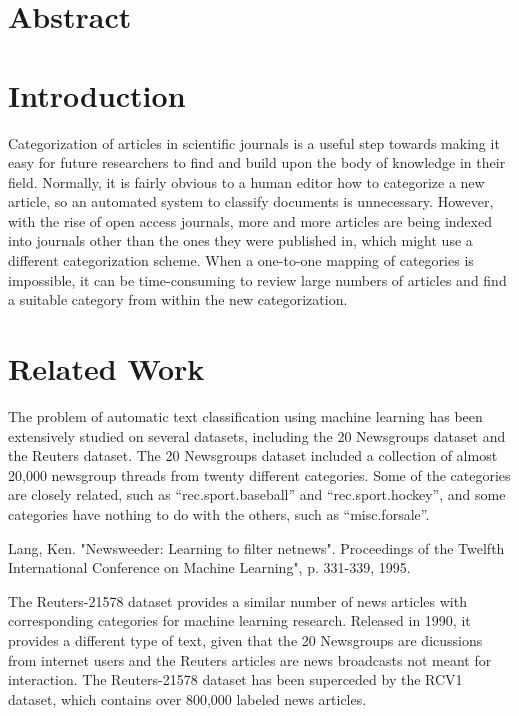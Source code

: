 \documentclass[10pt,twocolumn]{article}
\begin{document}
\section*{Abstract}

\section*{Introduction}

Categorization of articles in scientific journals is a useful step towards making it easy for future researchers to find and build upon the body of knowledge in their field.  Normally, it is fairly obvious to a human editor how to categorize a new article, so an automated system to classify documents is unnecessary.  However, with the rise of open access journals, more and more articles are being indexed into journals other than the ones they were published in, which might use a different categorization scheme.  When a one-to-one mapping of categories is impossible, it can be time-consuming to review large numbers of articles and find a suitable category from within the new categorization.

\section*{Related Work}

The problem of automatic text classification using machine learning has been extensively studied on several datasets, including the 20 Newsgroups dataset and the Reuters dataset.  The 20 Newsgroups dataset included a collection of almost 20,000 newsgroup threads from twenty different categories.  Some of the categories are closely related, such as ``rec.sport.baseball'' and ``rec.sport.hockey'', and some categories have nothing to do with the others, such as ``misc.forsale''.


Lang, Ken.  "Newsweeder: Learning to filter netnews".  Proceedings of the Twelfth International Conference on Machine Learning", p. 331-339, 1995.

The Reuters-21578 dataset provides a similar number of news articles with corresponding categories for machine learning research.  Released in 1990, it provides a different type of text, given that the 20 Newsgroups are dicussions from internet users and the Reuters articles are news broadcasts not meant for interaction.  The Reuters-21578 dataset has been superceded by the RCV1 dataset, which contains over 800,000 labeled news articles.
\end{document}
